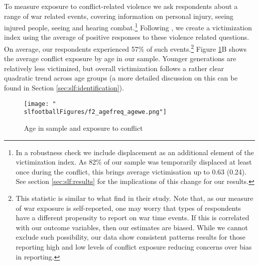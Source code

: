 To measure exposure to conflict-related violence we ask respondents about a range of war related events, covering information on personal injury, seeing injured people, seeing and hearing combat.\footnote{In a robustness check we include displacement as an additional element of the victimization index. As 82\% of our sample was temporarily displaced at least once during the conflict, this brings average victimisation up to 0.63 (0.24). See section \ref{sec:slf:results} for the implications of this change for our results.} Following \cite{Bellows2009b}, we create a victimization index using the average of positive responses to these violence related questions. On average, our respondents experienced 57\% of such events.\footnote{This statistic is similar to what \citet{Bellows2009b} find in their study. Note that, as our measure of war exposure is self-reported, one may worry that types of respondents have a different propensity to report on war time events. If this is correlated with our outcome variables, then our estimates are biased. While we cannot exclude such possibility, our data show consistent patterns results for those reporting high and low levels of conflict exposure reducing concerns over bias in reporting.}  Figure \ref{fig:slf:ageconflict}B shows the average conflict exposure by age in our sample. Younger generations are relatively less victimized, but overall victimization follows a rather clear quadratic trend across age groups (a more detailed discussion on this can be found in Section \ref{sec:slf:identification}).

\begin{figure}[htb]
  \texttt{[image: "\\slfootballFigures/f2\_agefreq\_agewe.png"]}
  \caption{Age in sample and exposure to conflict}
  \label{fig:slf:ageconflict}
\end{figure}

